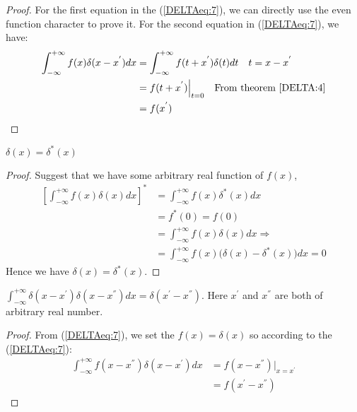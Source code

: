 \begin{proof}
For the first equation in the (\ref{DELTAeq:7}), we can directly use
the even function character to prove it. For the second equation in
(\ref{DELTAeq:7}), we have:
\begin{equation}\label{}
\begin{split}
  \int_{-\infty}^{+\infty}f(x)\delta(x - x^{'})dx &=
   \int_{-\infty}^{+\infty}f(t+x^{'})\delta(t)dt
   \quad t = x - x^{'}\\
    &= f(t+x^{'})\Big|_{t=0} \quad \text{From theorem \ref{DELTA:4}}\\
    &= f(x^{'})
\end{split}
\end{equation}
 \qedhere
\end{proof}

\begin{theorem}
$\delta(x) = \delta^{*}(x)$
\end{theorem}

\begin{proof}
Suggest that we have some arbitrary real function of $f(x)$,
\begin{equation}\label{}
\begin{split}
  \left[\int_{-\infty}^{+\infty}f(x)\delta(x)dx\right]^{*} &=
   \int_{-\infty}^{+\infty}f(x)\delta^{*}(x)dx \\
    &=f^{*}(0) = f(0) \\
    &= \int_{-\infty}^{+\infty}f(x)\delta(x)dx \Rightarrow \\
    &= \int_{-\infty}^{+\infty}f(x)
    \Big(\delta(x)-\delta^{*}(x)\Big)dx = 0
\end{split}
\end{equation}
Hence we have $\delta(x) = \delta^{*}(x)$. \qedhere
\end{proof}

\begin{theorem}
$\int_{-\infty}^{+\infty}\delta(x - x^{'}) \delta(x - x^{''})dx =
\delta(x^{'} - x^{''})$. Here $x^{'}$ and $x^{''}$ are both of
arbitrary real number.
\end{theorem}

\begin{proof}
From  (\ref{DELTAeq:7}), we set the $f(x) = \delta(x)$ so according
to the (\ref{DELTAeq:7}):
\begin{equation}\label{}
\begin{split}
  \int_{-\infty}^{+\infty}f(x- x^{''})\delta(x - x^{'})dx
  &= f(x- x^{''})\Big|_{x =x^{'}} \\
    &= f(x^{'}- x^{''})
\end{split}
\end{equation}
\qedhere
\end{proof}

